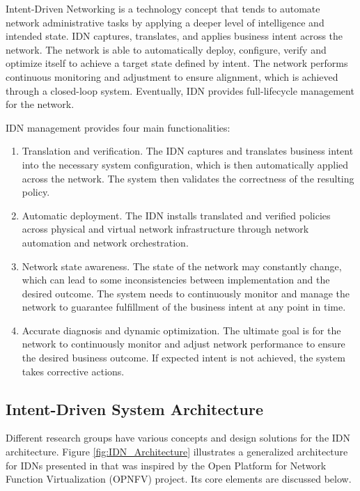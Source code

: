 Intent-Driven Networking is a technology concept that tends to automate network administrative tasks by applying a deeper level of intelligence and intended state. IDN captures, translates, and applies business intent across the network. The network is able to automatically deploy, configure, verify and optimize itself to achieve a target state defined by intent. The network performs continuous monitoring and adjustment to ensure alignment, which is achieved through a closed-loop system. Eventually, IDN provides full-lifecycle management for the network.\cite{8968429}

IDN management provides four main functionalities\cite[271]{Wei2020}: 

\begin{enumerate}
  \item Translation and verification. The IDN captures and translates business intent into the necessary system configuration, which is then automatically applied across the network. The system then validates the correctness of the resulting policy.
  \item Automatic deployment. The IDN installs translated and verified policies across physical and virtual network infrastructure through network automation and network orchestration.
  \item Network state awareness. The state of the network may constantly change, which can lead to some inconsistencies between implementation and the desired outcome. The system needs to continuously monitor and manage the network to guarantee fulfillment of the business intent at any point in time.
  \item Accurate diagnosis and dynamic optimization. The ultimate goal is for the network to continuously monitor and adjust network performance to ensure the desired business outcome. If expected intent is not achieved, the system takes corrective actions.
\end{enumerate}


\subsection{Intent-Driven System Architecture}

Different research groups have various concepts and design solutions for the IDN architecture. Figure \ref{fig:IDN_Architecture} illustrates a generalized architecture for IDNs presented in \cite[3]{Saha2018} that was inspired by the Open Platform for Network Function Virtualization (OPNFV) project. Its core elements are discussed below.  

